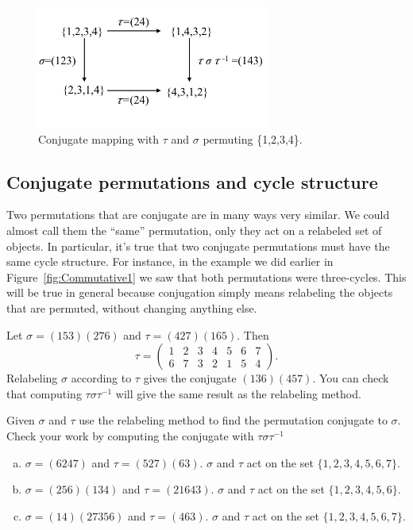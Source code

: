 \begin{figure}[ht]
\begin{center}
\includegraphics[width=3in]{images/Commutative2.png}
\caption{Conjugate mapping with $\tau$ and $\sigma$ permuting \{1,2,3,4\}.}\label{fig:Commutative2}
\end{center}
\end{figure}

\subsection *{Conjugate permutations and cycle structure}

Two permutations that are conjugate are in many ways very similar. We could almost call them the ``same'' permutation, only they act on a relabeled set of objects. In particular, it's true that two conjugate permutations must have the same cycle structure. For instance, in the example we did earlier in Figure~\ref{fig:Commutative1} we saw that both permutations were three-cycles.  This will be true in general because conjugation simply means relabeling the objects that are permuted, without changing anything else.

\begin{example}\label{example:actions:Conj2}
Let $\sigma = (153)(276)$ and $\tau = (427)(165)$. Then
$$\tau=\begin{pmatrix} 1&2&3&4&5&6&7\\6&7&3&2&1&5&4  \end{pmatrix}.$$ 
Relabeling $\sigma$ according to $\tau$ gives the conjugate $(136)(457)$. You can check that computing $ \tau \sigma \tau^{-1}$ will give the same result as the relabeling method.
\end{example}
\begin{exercise}\label{exercise:actions:Conj3}
Given $\sigma$ and $\tau$ use the relabeling method to find the permutation conjugate to $\sigma$.  Check your work by computing the conjugate with $\tau\sigma\tau^{-1}$
\begin{enumerate}[(a)]
\item $\sigma=(6247)$ and $\tau=(527)(63)$.  $\sigma$ and $\tau$ act on the set $\{1,2,3,4,5,6,7\}$.
\item$\sigma=(256)(134)$ and $\tau=(21643)$.  $\sigma$ and $\tau$ act on the set $\{1,2,3,4,5,6\}$.
\item$\sigma=(14)(27356)$ and $\tau=(463)$.  $\sigma$ and $\tau$ act on the set $\{1,2,3,4,5,6,7\}$.
\end{enumerate}
\end{exercise}

